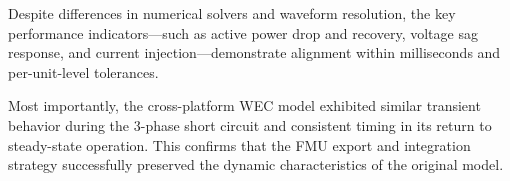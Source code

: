 \documentclass[conference]{IEEEtran}
\begin{document}
    Despite differences in numerical solvers and waveform resolution, the key performance indicators—such as active power drop and recovery, voltage sag response, and current injection—demonstrate alignment within milliseconds and per-unit-level tolerances.
    
    Most importantly, the cross-platform WEC model exhibited similar transient behavior during the 3-phase short circuit and consistent timing in its return to steady-state operation. This confirms that the FMU export and integration strategy successfully preserved the dynamic characteristics of the original model.




\end{document}
